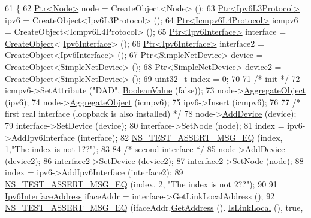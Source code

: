 \begin{DoxyCode}
61 \{
62   \hyperlink{classns3_1_1Ptr}{Ptr<Node>} node = CreateObject<Node> ();
63   \hyperlink{classns3_1_1Ptr}{Ptr<Ipv6L3Protocol>} ipv6 = CreateObject<Ipv6L3Protocol> ();
64   \hyperlink{classns3_1_1Ptr}{Ptr<Icmpv6L4Protocol>} icmpv6 = CreateObject<Icmpv6L4Protocol> ();
65   \hyperlink{classns3_1_1Ptr}{Ptr<Ipv6Interface>} \textcolor{keyword}{interface }= \hyperlink{group__object_gad1d36559be10afa72c3656fd8598c1e2}{CreateObject}<
      \hyperlink{classns3_1_1Ipv6Interface}{Ipv6Interface}> ();
66   \hyperlink{classns3_1_1Ptr}{Ptr<Ipv6Interface>} interface2 = CreateObject<Ipv6Interface> ();
67   \hyperlink{classns3_1_1Ptr}{Ptr<SimpleNetDevice>} device = CreateObject<SimpleNetDevice> ();
68   \hyperlink{classns3_1_1Ptr}{Ptr<SimpleNetDevice>} device2 = CreateObject<SimpleNetDevice> ();
69   uint32\_t index = 0;
70 
71   \textcolor{comment}{/* init */}
72   icmpv6->SetAttribute (\textcolor{stringliteral}{"DAD"}, \hyperlink{classns3_1_1BooleanValue}{BooleanValue} (\textcolor{keyword}{false}));
73   node->\hyperlink{classns3_1_1Object_a79dd435d300f3deca814553f561a2922}{AggregateObject} (ipv6);
74   node->\hyperlink{classns3_1_1Object_a79dd435d300f3deca814553f561a2922}{AggregateObject} (icmpv6);
75   ipv6->Insert (icmpv6);
76 
77   \textcolor{comment}{/* first real interface (loopback is also installed) */}
78   node->\hyperlink{classns3_1_1Node_a42ff83ee1d5d1649c770d3f5b62375de}{AddDevice} (device);
79   interface->SetDevice (device);
80   interface->SetNode (node);
81   index = ipv6->AddIpv6Interface (interface);
82   \hyperlink{group__testing_ga2a9d78cffb3db8e867c35fff0b698cf5}{NS\_TEST\_ASSERT\_MSG\_EQ} (index, 1,\textcolor{stringliteral}{"The index is not 1??"});
83 
84   \textcolor{comment}{/* second interface */}
85   node->\hyperlink{classns3_1_1Node_a42ff83ee1d5d1649c770d3f5b62375de}{AddDevice} (device2);
86   interface2->SetDevice (device2);
87   interface2->SetNode (node);
88   index = ipv6->AddIpv6Interface (interface2);
89   \hyperlink{group__testing_ga2a9d78cffb3db8e867c35fff0b698cf5}{NS\_TEST\_ASSERT\_MSG\_EQ} (index, 2, \textcolor{stringliteral}{"The index is not 2??"});
90 
91   \hyperlink{classns3_1_1Ipv6InterfaceAddress}{Ipv6InterfaceAddress} ifaceAddr = interface->GetLinkLocalAddress ();
92   \hyperlink{group__testing_ga2a9d78cffb3db8e867c35fff0b698cf5}{NS\_TEST\_ASSERT\_MSG\_EQ} (ifaceAddr.\hyperlink{classns3_1_1Ipv6InterfaceAddress_a80d4caacff72bddc3045a5929519e107}{GetAddress} ().
      \hyperlink{classns3_1_1Ipv6Address_a881c3e796e2afdbd49b2ec630ada1126}{IsLinkLocal} (), \textcolor{keyword}{true},

\end{DoxyCode}

